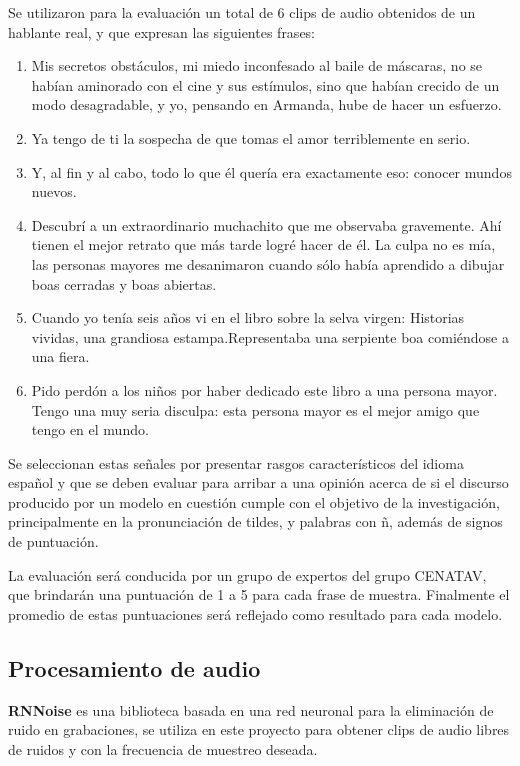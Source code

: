 Se utilizaron para la evaluación un total de 6 clips de audio obtenidos de un hablante real, y que expresan las siguientes frases:
\begin{enumerate}
	\item Mis secretos obstáculos, mi miedo inconfesado al baile de máscaras, no se habían aminorado con el cine y sus estímulos, sino que habían crecido de un modo desagradable, y yo, pensando en Armanda, hube de hacer un esfuerzo. \label{sentence1}
	\item Ya tengo de ti la sospecha de que tomas el amor terriblemente en serio. \label{sentence2}
	\item Y, al fin y al cabo, todo lo que él quería era exactamente eso: conocer mundos nuevos. \label{sentence3}
	\item Descubrí a un extraordinario muchachito que me observaba gravemente. Ahí tienen el mejor retrato que más tarde logré hacer de él. La culpa no es mía, las personas mayores me desanimaron cuando sólo había aprendido a dibujar boas cerradas y boas abiertas. \label{sentence4}
	\item Cuando yo tenía seis años vi en el libro sobre la selva virgen: Historias vividas, una grandiosa estampa.Representaba una serpiente boa comiéndose a una fiera. \label{sentence5}
	\item Pido perdón a los niños por haber dedicado este libro a una persona mayor. Tengo una muy seria disculpa: esta persona mayor es el mejor amigo que tengo en el mundo. \label{sentence6}
\end{enumerate}

Se seleccionan estas señales por presentar rasgos característicos del idioma español y que se deben evaluar para arribar a una opinión acerca de si el discurso producido por un modelo en cuestión cumple con el objetivo de la investigación, principalmente en la pronunciación de tildes, y palabras con ñ, además de signos de puntuación. 

La evaluación será conducida por un grupo de expertos del grupo CENATAV, que brindarán una puntuación de 1 a 5 para cada frase de muestra. Finalmente el promedio de estas puntuaciones será reflejado como resultado para cada modelo.  



\subsection{Procesamiento de audio}

\textbf{RNNoise} es una biblioteca basada en una red neuronal para la eliminación de ruido en grabaciones, se utiliza en este proyecto para obtener clips de audio libres de ruidos y con la frecuencia de muestreo deseada.

